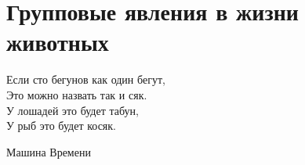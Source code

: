 \section{Групповые явления в жизни животных} %
\label{sec:AnimalFlocking}
\epigraph{Если сто бегунов как один бегут,\\
Это можно назвать так и сяк.\\
У лошадей это будет табун,\\
У рыб это будет косяк.}{Машина Времени}

